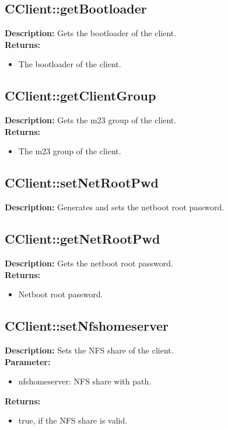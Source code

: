 \subsection{CClient::getBootloader}
\textbf{Description:} Gets the bootloader of the client.\\
\textbf{Returns:}
\begin{itemize}
\item The bootloader of the client.
\end{itemize}

\subsection{CClient::getClientGroup}
\textbf{Description:} Gets the m23 group of the client.\\
\textbf{Returns:}
\begin{itemize}
\item The m23 group of the client.
\end{itemize}

\subsection{CClient::setNetRootPwd}
\textbf{Description:} Generates and sets the netboot root password.\\

\subsection{CClient::getNetRootPwd}
\textbf{Description:} Gets the netboot root password.\\
\textbf{Returns:}
\begin{itemize}
\item Netboot root password.
\end{itemize}

\subsection{CClient::setNfshomeserver}
\textbf{Description:} Sets the NFS share of the client.\\
\textbf{Parameter:}
\begin{itemize}
\item nfshomeserver: NFS share with path.
\end{itemize}
\textbf{Returns:}
\begin{itemize}
\item true, if the NFS share is valid.
\end{itemize}

